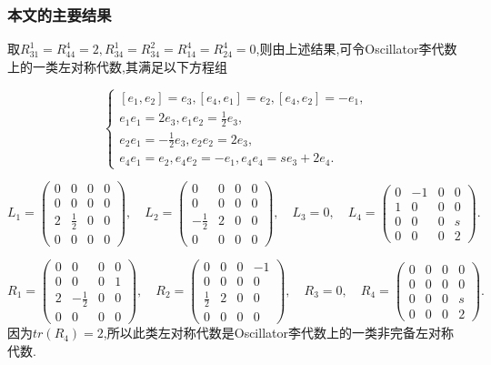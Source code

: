\documentclass[aspectratio=169, 10pt, utf8, mathserif]{beamer}
\begin{document}
\begin{frame}[plain]
	\frametitle{本文的主要结果}
	\begin{Example}
		取$R_{31}^1=R_{44}^4=2,R_{34}^1=R_{34}^2=R_{14}^4=R_{24}^4=0$,则由上述结果,可令Oscillator李代数上的一类左对称代数,其满足以下方程组
		
		\begin{equation*}\left\{
		\begin{array}{l}
		[e_1,e_2]=e_3,[e_4,e_1]=e_2,[e_4,e_2]=-e_1,\\
		e_1e_1=2e_3,e_1e_2=\frac{1}{2}e_3,\\
		e_2e_1=-\frac{1}{2}e_3,e_2e_2=2e_3,\\
		e_4e_1=e_2,e_4e_2=-e_1,e_4e_4=se_3+2e_4.
		\end{array}
		\right.
		\end{equation*}
		
		$$L_1=\left({\begin{smallmatrix}
			 0 & 0 & 0 & 0 \\
			 0 & 0 & 0 & 0  \\
			 2 & \frac{1}{2} & 0 & 0  \\
			 0 & 0 & 0 & 0
			\end{smallmatrix}} \right),\quad L_2=\left({\begin{smallmatrix}
			 0 & 0 & 0 & 0 \\
			 0 & 0 & 0 & 0  \\
			 -\frac{1}{2} & 2 & 0 & 0  \\
			 0 & 0 & 0 & 0
			\end{smallmatrix}} \right),\quad L_3=0,\quad L_4=\left({\begin{smallmatrix}
			 0 & -1 & 0 & 0 \\
			 1 & 0 & 0 & 0  \\
			 0 & 0 & 0 & s  \\
			 0 & 0 & 0 & 2
			\end{smallmatrix}} \right).$$
		
		$$R_1=\left({\begin{smallmatrix}
			 0 & 0 & 0 & 0 \\
			 0 & 0 & 0 & 1  \\
			 2 & -\frac{1}{2} & 0 & 0  \\
			 0 & 0 & 0 & 0
			\end{smallmatrix}} \right),\quad R_2=\left({\begin{smallmatrix}
			 0 & 0 & 0 & -1 \\
			 0 & 0 & 0 & 0  \\
			 \frac{1}{2} & 2 & 0 & 0  \\
			 0 & 0 & 0 & 0
			\end{smallmatrix}} \right),\quad R_3=0,\quad R_4=\left({\begin{smallmatrix}
			 0 & 0 & 0 & 0 \\
			 0 & 0 & 0 & 0  \\
			 0 & 0 & 0 & s  \\
			 0 & 0 & 0 & 2
			\end{smallmatrix}} \right).$$
		因为$tr(R_4)=2$,所以此类左对称代数是Oscillator李代数上的一类非完备左对称代数.
		\end{Example}
\end{frame}

\begin{frame}
\end{frame}
\end{document}
